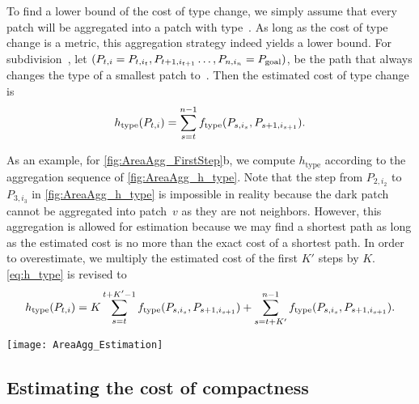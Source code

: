 \documentclass[acmsmall,natbib=false]{acmart}
\begin{document}
To find a lower bound of the cost of type change, 
we simply assume that 
every patch will be aggregated into a patch with type~\Tgoal.
As long as the cost of type change is a metric, this aggregation 
strategy indeed yields a lower bound.
%
For subdivision~\Pnode, let
$(P_{t,i}=P_{t,i_t}, P_{t+1,i_{t+1}} \dots,P_{n,i_n}=P_\mathrm{goal})$,
be the path that always changes the type of a smallest patch 
to~\Tgoal.
Then the estimated cost of type change is
\begin{equation}
\label{eq:h_type}
h_\mathrm{type}(P_{t,i})=
\sum_{s=t}^{n-1}f_\mathrm{type}(P_{s,i_s},P_{s+1,i_{s+1}}).
\end{equation}

As an example, for \fig\ref{fig:AreaAgg_FirstStep}b, we compute 
$h_\mathrm{type}$ 
according to the aggregation sequence of 
\fig\ref{fig:AreaAgg_h_type}.
Note that the step from $P_{2,i_2}$ to 
$P_{3,i_3}$ 
in 
\fig\ref{fig:AreaAgg_h_type} is impossible in reality 
because the dark patch cannot be aggregated into patch~$v$
as they are not neighbors. 
However, this aggregation is allowed for estimation 
because we may find a shortest path as long as 
the estimated cost is no more than 
the exact cost of a shortest path.
In order to overestimate, we multiply the estimated cost of the 
first $K'$ steps by $K$.
\fo\ref{eq:h_type} is revised to
\begin{equation}
\label{eq:o_type}
h_\mathrm{type}(P_{t,i})=
K\sum_{s=t}^{t+K'-1}f_\mathrm{type}(P_{s,i_s},P_{s+1,i_{s+1}})+
\sum_{s=t+K'}^{n-1}f_\mathrm{type}(P_{s,i_s},P_{s+1,i_{s+1}}).
\nonumber
\end{equation}


\begin{figure*}[tb]
\centering
\texttt{[image: AreaAgg\_Estimation]}
\caption{An ``aggregation sequence'' for computing 
	$h_{\mathrm{type}}$, 
	based on the aggregation result of 
	\fig\ref{fig:AreaAgg_FirstStep}b}
\label{fig:AreaAgg_h_type}
\end{figure*}


\subsection{Estimating the cost of compactness}
\label{sec:AreaAgg_h_comp}
\end{document}
